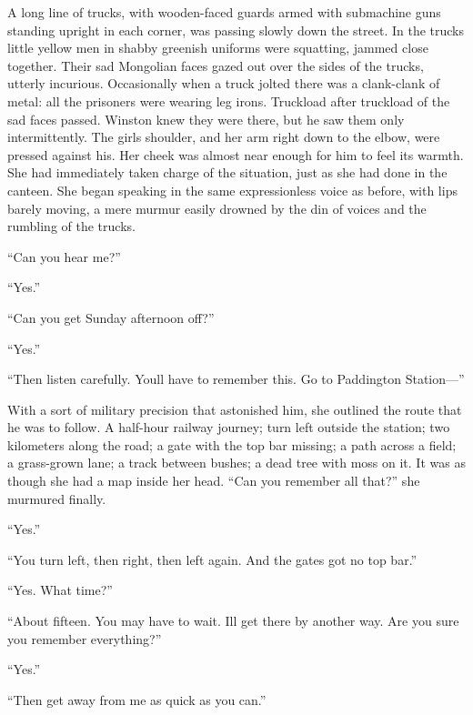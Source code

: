 A long line of trucks, with wooden-faced guards armed with submachine
guns standing upright in each corner, was passing slowly down the
street. In the trucks little yellow men in shabby greenish uniforms were
squatting, jammed close together. Their sad Mongolian faces gazed out
over the sides of the trucks, utterly incurious. Occasionally when a
truck jolted there was a clank-clank of metal: all the prisoners were
wearing leg irons. Truckload after truckload of the sad faces passed.
Winston knew they were there, but he saw them only intermittently. The
girl\textquotesingle s shoulder, and her arm right down to the elbow,
were pressed against his. Her cheek was almost near enough for him to
feel its warmth. She had immediately taken charge of the situation, just
as she had done in the canteen. She began speaking in the same
expressionless voice as before, with lips barely moving, a mere murmur
easily drowned by the din of voices and the rumbling of the trucks.

``Can you hear me?''

``Yes.''

``Can you get Sunday afternoon off?''

``Yes.''

``Then listen carefully. You\textquotesingle ll have to remember this. Go
to Paddington Station---''

With a sort of military precision that astonished him, she outlined the
route that he was to follow. A half-hour railway journey; turn left
outside the station; two kilometers along the road; a gate with the top
bar missing; a path across a field; a grass-grown lane; a track between
bushes; a dead tree with moss on it. It was as though she had a map
inside her head. ``Can you remember all that?'' she murmured finally.

``Yes.''

``You turn left, then right, then left again. And the
gate\textquotesingle s got no top bar.''

``Yes. What time?''

``About fifteen. You may have to wait. I\textquotesingle ll get there by
another way. Are you sure you remember everything?''

``Yes.''

``Then get away from me as quick as you can.''

